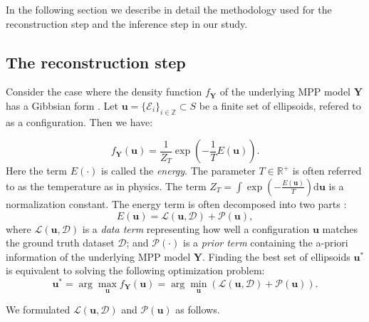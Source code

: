 \documentclass[journal]{IEEEtran}
\newcommand{\dd}[1]{\mathrm{d}#1}%
\begin{document}
In the following section we describe in detail the methodology used
for the reconstruction step and the inference step in our study.

\subsection{The reconstruction step}
\label{sec:reconstr-step:-appr}

Consider the case where the density function $f_{\mathbf{Y}}$ of the
underlying MPP model $\mathbf{Y}$ has a Gibbsian form
\cite{moller2007modern}. Let
$\mathbf{u} = \{ \mathcal{E}_i\}_{i \in \mathbb{Z}} \subset S$ be a
finite set of ellipsoids, refered to as a configuration. Then we have:

\begin{equation}
  \label{eq:gibbs-density}
  f_{\mathbf{Y}}(\mathbf{u}) = \frac{1}{Z_T} \exp \left( - \frac{1}{T}
    E(\mathbf{u}) \right).
\end{equation}
Here the term $E(\cdot)$ is called the \textit{energy}. The parameter
$T \in \mathbb{R}^{+}$ is often referred to as the temperature as in
physics. The term
$Z_T = \int \exp \left( - \frac{E(\mathbf{u})}{T} \right) \dd
\mathbf{u}$ is a normalization constant. The energy term is often
decomposed into two parts \cite{lafarge2010geometric}
\cite{descombes2009object}:
\begin{equation}
  \label{mpp-energy}
  E(\mathbf{u}) = \mathcal{L}(\mathbf{u}, \mathcal{D})
  + \mathcal{P} (\mathbf{u}),
\end{equation}
where $\mathcal{L}(\mathbf{u}, \mathcal{D})$ is a \textit {data term}
representing how well a configuration $\mathbf{u}$ matches the ground
truth dataset $\mathcal{D}$; and $\mathcal{P} (\cdot)$ is a \textit
{prior term} containing the a-priori information of the underlying MPP
model $\mathbf{Y}$. Finding the best set of ellipsoids
$\mathbf{u}^{*}$ is equivalent to solving the following optimization
problem:
\begin{equation}
  \label{mpp-opt-energy}
  \mathbf{u}^{*}
  = \arg \max_{\mathbf{u}}{f_{\mathbf{Y}}(\mathbf{u})}
  = \arg\min_ {\mathbf{u}} \left( \mathcal{L}(\mathbf{u},
    \mathcal{D}) + \mathcal{P} (\mathbf{u}) \right).
\end{equation}

We formulated $\mathcal{L}(\mathbf{u}, \mathcal{D})$ and
$\mathcal{P} (\mathbf{u})$ as follows.
\end{document}
